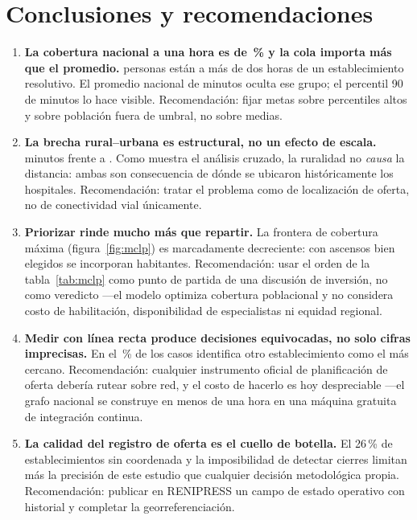 \documentclass[10pt,a4paper]{article}
\begin{document}
\section{Conclusiones y recomendaciones}

\begin{enumerate}
\item \textbf{La cobertura nacional a una hora es de \kpiShareHastaSeisCero\,\% y la
cola importa más que el promedio.} \kpiPobMasUnoDosCero{} personas están a más de dos
horas de un establecimiento resolutivo. El promedio nacional de
\kpiTiempoMedio{} minutos oculta ese grupo; el percentil 90 de
\kpiTiempoPnoventa{} minutos lo hace visible. Recomendación: fijar metas sobre
percentiles altos y sobre población fuera de umbral, no sobre medias.

\item \textbf{La brecha rural--urbana es estructural, no un efecto de escala.}
\kpiTiempoMedioRural{} minutos frente a \kpiTiempoMedioUrbano{}. Como muestra el
análisis cruzado, la ruralidad no \emph{causa} la distancia: ambas son
consecuencia de dónde se ubicaron históricamente los hospitales. Recomendación:
tratar el problema como de localización de oferta, no de conectividad vial
únicamente.

\item \textbf{Priorizar rinde mucho más que repartir.} La frontera de cobertura
máxima (figura~\ref{fig:mclp}) es marcadamente decreciente: con
\kpiMclpPresupuesto{} ascensos bien elegidos se incorporan
\kpiMclpGanancia{} habitantes. Recomendación: usar el orden de la
tabla~\ref{tab:mclp} como punto de partida de una discusión de inversión, no
como veredicto —el modelo optimiza cobertura poblacional y no considera costo de
habilitación, disponibilidad de especialistas ni equidad regional.

\item \textbf{Medir con línea recta produce decisiones equivocadas, no solo
cifras imprecisas.} En el \kpiShareCambiaCercano\,\% de los casos identifica otro
establecimiento como el más cercano. Recomendación: cualquier instrumento
oficial de planificación de oferta debería rutear sobre red, y el costo de
hacerlo es hoy despreciable —el grafo nacional se construye en menos de una hora
en una máquina gratuita de integración continua.

\item \textbf{La calidad del registro de oferta es el cuello de botella.} El
\num{26}\,\% de establecimientos sin coordenada y la imposibilidad de detectar
cierres limitan más la precisión de este estudio que cualquier decisión
metodológica propia. Recomendación: publicar en RENIPRESS un campo de estado
operativo con historial y completar la georreferenciación.
\end{enumerate}
\end{document}
